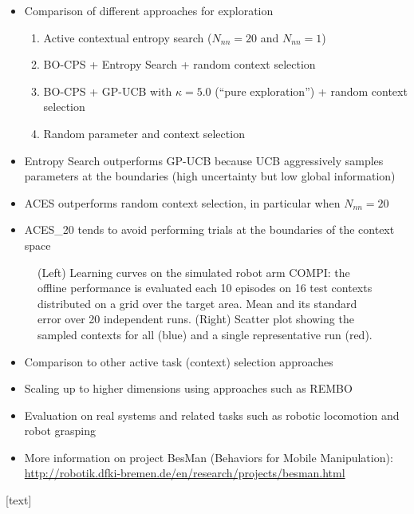 \begin{block}{}
\begin{center}
\begin{itemize}
 \item Comparison of different approaches for exploration
 \begin{enumerate}
  \item Active contextual entropy search ($N_{nn} = 20$ and $N_{nn} = 1$)
  \item BO-CPS + Entropy Search +  random context selection
  \item BO-CPS + GP-UCB with $\kappa=5.0$ (``pure exploration'') + random context selection
  \item Random parameter and context selection
 \end{enumerate}
 \item Entropy Search outperforms GP-UCB because UCB aggressively samples parameters at the boundaries (high uncertainty but low global information)
 \item ACES outperforms random context selection, in particular when $N_{nn} = 20$
 \item ACES\_20 tends to avoid performing trials at the boundaries of the context space
\end{itemize}

\begin{figure}
\centering
\caption{(Left) Learning curves on the simulated robot arm COMPI: the offline performance is evaluated each 10 episodes on 16 test contexts distributed on a grid over the target area. Mean and its standard error over 20 independent runs. (Right) Scatter plot showing the sampled contexts for all (blue) and a single representative run (red).}
\label{fig:experiment}
\end{figure}

\end{center}
\end{block}

\begin{block}{}
\begin{itemize}
 \item Comparison to other active task (context) selection approaches \cite{fabisch_accounting_2015}
 \item Scaling up to higher dimensions using approaches such as REMBO
\cite{wang_bayesian_2013}
 \item Evaluation on real systems and related tasks such as robotic locomotion \cite{calandra_bayesian_2014,lizotte_automatic_2007} and robot grasping \cite{kroemer_combining_2010}
 \item More information on project BesMan (Behaviors for Mobile Manipulation):
\url{http://robotik.dfki-bremen.de/en/research/projects/besman.html}
\end{itemize}
\end{block}

\begin{block}{}

\begin{multicols}{2}
{\scriptsize
{}[text]


}
\end{multicols}

\end{block}
